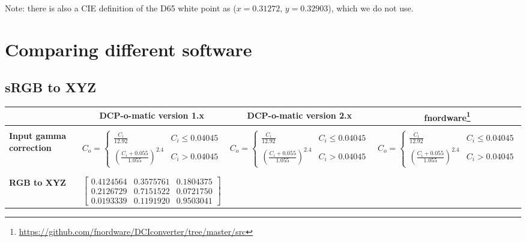 \documentclass{article}
\begin{document}
Note: there is also a CIE definition of the D65 white point as ($x =
0.31272$, $y = 0.32903$), which we do not use.



\section{Comparing different software}

\subsection{sRGB to XYZ}

\begin{minipage}{\textwidth}
\begin{tabular}{|l|c|c|c|}
\hline
& \textbf{DCP-o-matic version 1.x}
& \textbf{DCP-o-matic version 2.x}
& \textbf{fnordware}\footnote{\url{https://github.com/fnordware/DCIconverter/tree/master/src}} \\

\hline
& & & \\
\parbox[c][2em][c]{2cm}{\textbf{Input gamma correction}} &
$C_o = \left\{ \begin{array}{ll} \frac{C_i}{12.92} & C_i \leq 0.04045 \\ \left(\frac{C_i + 0.055}{1.055}\right)^{2.4} & C_i > 0.04045 \end{array} \right.$ &
$C_o = \left\{ \begin{array}{ll} \frac{C_i}{12.92} & C_i \leq 0.04045 \\ \left(\frac{C_i + 0.055}{1.055}\right)^{2.4} & C_i > 0.04045 \end{array} \right.$ &
$C_o = \left\{ \begin{array}{ll} \frac{C_i}{12.92} & C_i \leq 0.04045 \\ \left(\frac{C_i + 0.055}{1.055}\right)^{2.4} & C_i > 0.04045 \end{array} \right.$ \\
& & & \\

\hline
& & & \\
\textbf{RGB to XYZ} &
$\left[\begin{array}{lll} 0.4124564 & 0.3575761 & 0.1804375 \\
                          0.2126729 & 0.7151522 & 0.0721750 \\
	                  0.0193339 & 0.1191920 & 0.9503041 \end{array}\right]$ &


\end{tabular}
\end{minipage}
\end{document}

